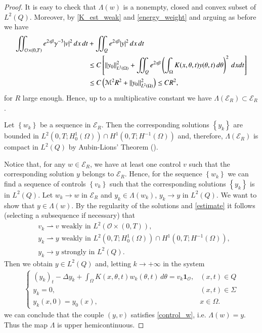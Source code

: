 \documentclass[preprint,1p]{elsarticle}
\newcommand{\D}{\displaystyle}
\newcommand{\norm}[2]{\left\|#1\right\|_{#2}}
\newcommand{\intd}{\displaystyle\int \kern -7pt \int}
\begin{document}
\begin{proof}
It is easy to check that $\Lambda(w)$ is a nonempty, closed and convex subset of $L^2(Q)$. Moreover, by \eqref{K_est_weak} and \eqref{energy_weight} and arguing as before we have
\begin{align}\label{estimate}
	\intd_{\mathcal O\times(0,T)} e^{2s\beta}\gamma^{-3} |v|^2\,dx\,dt & + \intd_Q e^{2s\beta}|y|^2\,dx\,dt \notag 
	\\
	&\leq C \left[\norm{y_0}{L^2(\Omega)}^2 + \intd_Qe^{2s\beta}\left(\int_\Omega K(x,\theta,t)y(\theta,t)\,d\theta\right)^2\,dxdt\right] \notag 
	\\
	&\leq C\left(\mathcal M^2R^2 + \norm{y_0}{L^2(\Omega)}^2\right) \leq CR^2,
\end{align}
for $R$ large enough. Hence, up to a multiplicative constant we have $\Lambda(\mathcal E_R)\subset \mathcal E_R$. 

Let $\left\{w_k\right\}$ be a sequence in $\mathcal E_R$. Then the corresponding solutions $\left\{y_k\right\}$ are bounded in $L^2(0,T;H^1_0(\Omega))\cap H^1(0,T;H^{-1}(\Omega))$ and, therefore, $\Lambda(\mathcal E_R)$ is compact in $L^2(Q)$ by Aubin-Lions' Theorem (\cite{simon1986compact}).

Notice that, for any $w\in \mathcal E_R$, we have at least one control $v$ such that the corresponding solution $y$ belongs to $\mathcal E_R$. Hence, for the sequence $\left\{w_k\right\}$ we can find a sequence of controls $\left\{v_k\right\}$ such that the corresponding solutions $\left\{y_k\right\}$ is in $L^2(Q)$. Let $w_k\to w$ in $\mathcal E_R$ and $y_k\in \Lambda(w_k)$, $y_k\to y$ in $L^2(Q)$. We want to show that $y\in\Lambda(w)$. By the regularity of the solutions and \eqref{estimate} it follows (selecting a subsequence if necessary) that
\begin{align*}
	& v_k\rightharpoonup v \textrm{ weakly in } L^2(\mathcal O\times(0,T)),
	\\
	& y_k\rightharpoonup y \textrm{ weakly in } L^2(0,T;H^1_0(\Omega))\cap H^1(0,T;H^{-1}(\Omega)),
	\\
	& y_k\to y \textrm{ strongly in } L^2(Q). 
\end{align*}
Then we obtain $y\in L^2(Q)$ and, letting $k\to +\infty$ in the system 
\begin{align*}
	\begin{cases}
		\D (y_k)_t - \Delta y_k + \int_\Omega K(x,\theta,t)w_k(\theta,t)\,d\theta = v_k\mathbf{1}_{\mathcal O}, & (x,t)\in Q
		\\
		y_k = 0, & (x,t)\in\Sigma
		\\
		y_k(x,0) = y_0(x), & x\in\Omega.
	\end{cases}
\end{align*} 
we can conclude that the couple $(y,v)$ satisfies \eqref{control_w}, i.e. $\Lambda(w) = y$. Thus the map $\Lambda$ is upper hemicontinuous.


\end{proof}
\end{document}
